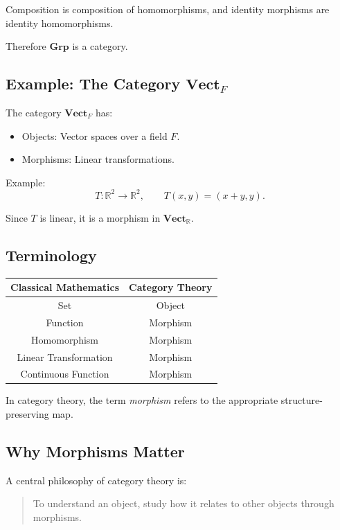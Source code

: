 Composition is composition of homomorphisms, and identity morphisms are identity homomorphisms.

Therefore $\mathbf{Grp}$ is a category.

\subsection{Example: The Category \texorpdfstring{$\mathbf{Vect}_F$}{VectF}}

The category $\mathbf{Vect}_F$ has:

\begin{itemize}
    \item Objects: Vector spaces over a field $F$.
    \item Morphisms: Linear transformations.
\end{itemize}

Example:
\[
T:\mathbb R^2\to\mathbb R^2,
\qquad
T(x,y)=(x+y,y).
\]

Since $T$ is linear, it is a morphism in $\mathbf{Vect}_{\mathbb R}$.

\subsection{Terminology}

\begin{center}
\begin{tabular}{|c|c|}
\hline
Classical Mathematics & Category Theory \\
\hline
Set & Object \\
Function & Morphism \\
Homomorphism & Morphism \\
Linear Transformation & Morphism \\
Continuous Function & Morphism \\
\hline
\end{tabular}
\end{center}

In category theory, the term \emph{morphism} refers to the appropriate structure-preserving map.

\subsection{Why Morphisms Matter}

A central philosophy of category theory is:

\begin{quote}
To understand an object, study how it relates to other objects through morphisms.
\end{quote}

